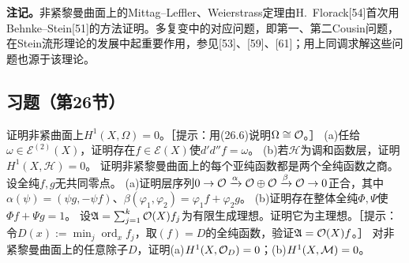 \textbf{注记。}非紧黎曼曲面上的Mittag--Leffler、Weierstrass定理由H.~Florack[54]首次用Behnke--Stein[51]的方法证明。多复变中的对应问题，即第一、第二Cousin问题，在Stein流形理论的发展中起重要作用，参见[53]、[59]、[61]；用上同调求解这些问题也源于该理论。
\subsection*{习题（第26节）}
证明非紧曲面上$H^1(X,\Omega)=0$。［提示：用(26.6)说明$\Omega\cong\mathcal O$。］
(a)任给$\omega\in\mathcal E^{(2)}(X)$，证明存在$f\in\mathcal E(X)$使$d'd''f=\omega$。
(b)若$\mathcal H$为调和函数层，证明$H^1(X,\mathcal H)=0$。
证明非紧黎曼曲面上的每个亚纯函数都是两个全纯函数之商。
设全纯$f,g$无共同零点。
(a)证明层序列$0\to\mathcal O\xrightarrow\alpha\mathcal O\oplus\mathcal O\xrightarrow\beta\mathcal O\to0$正合，其中$\alpha(\psi)=(\psi g,-\psi f)$、$\beta(\varphi_1,\varphi_2)=\varphi_1f+\varphi_2g$。
(b)证明存在整体全纯$\Phi,\Psi$使$\Phi f+\Psi g=1$。
设$\mathfrak A=\sum_{j=1}^k\mathcal O(X)f_j$为有限生成理想。证明它为主理想。［提示：令$D(x):=\min_j\operatorname{ord}_xf_j$，取$(f)=D$的全纯函数，验证$\mathfrak A=\mathcal O(X)f$。］
对非紧黎曼曲面上的任意除子$D$，证明(a)$H^1(X,\mathcal O_D)=0$；(b)$H^1(X,\mathcal M)=0$。
